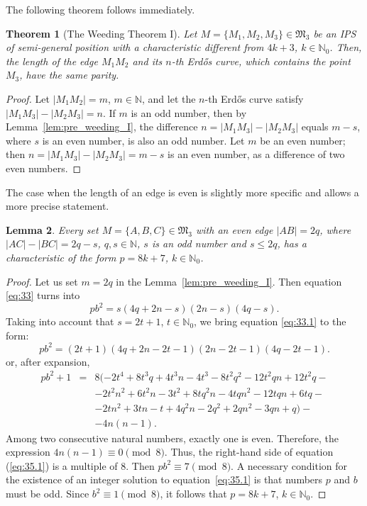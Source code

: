 \documentclass[a4paper,14pt]{article} %
\theoremstyle{plain}
\newtheorem{theorem}{Theorem}[section]
\newtheorem{lemma}[theorem]{Lemma}
\theoremstyle{definition}
\begin{document}
The following theorem follows immediately.

\begin{theorem}[The Weeding Theorem I]
	\label{thm:weeding_I}
	Let $M = \{M_1, M_2, M_3\} \in \mathfrak{M}_3$ be an IPS of semi-general position with a characteristic different from $4k+3$, $k \in \mathbb{N}_0$. Then, the length of the edge $M_1 M_2$ and its $n$-th Erdős curve, which contains the point $M_3$, have the same parity.
\end{theorem}

\begin{proof}
	Let $|M_1 M_2| = m$, $m \in \mathbb{N}$, and let the $n$-th Erdős curve satisfy $|M_1 M_3| - |M_2 M_3| = n$.
	If $m$ is an odd number, then by Lemma~\ref{lem:pre_weeding_I}, the difference $n = |M_1 M_3| - |M_2 M_3|$ equals $m - s$, where $s$ is an even number, is also an odd number.
	Let $m$ be an even number; then $n = |M_1 M_3| - |M_2 M_3| = m - s$ is an even number, as a difference of two even numbers.
\end{proof}

The case when the length of an edge is even is slightly more specific and allows a more precise statement.

\begin{lemma}
	\label{lem:pre_weeding_II}
	Every set $M = \{A, B, C\} \in \mathfrak{M}_3$ with an even edge $|AB| = 2q$, where $|AC| - |BC| = 2q - s$, $q, s \in \mathbb{N}$, $s$ is an odd number and $s \leq 2q$, has a characteristic of the form $p = 8k + 7$, $k \in \mathbb{N}_0$.
\end{lemma}

\begin{proof}
	Let us set $m = 2q$ in the Lemma~\ref{lem:pre_weeding_I}.
	Then equation \eqref{eq:33} turns into
	\begin{equation}
		\label{eq:33.1}
		pb^2 = s(4q + 2n - s)(2n - s)(4q - s).
	\end{equation}
	Taking into account that $s = 2t + 1$, $t \in \mathbb{N}_0$,
	we bring equation \eqref{eq:33.1} to the form:
	\begin{equation}
	pb^2 = (2t + 1)(4q + 2n - 2t - 1)(2n - 2t - 1)(4q - 2t - 1).
	\label{eq: 34.2}
	\end{equation}
	or, after expansion,
	\begin{eqnarray}
		pb^2 + 1&=& 8(-2t^4+8t^3q+4t^3n-4t^3-8t^2q^2-12t^2qn+12t^2q- {}\nonumber\\
			 &     &-2t^2n^2+6t^2n-3t^2+8tq^2n-4tqn^2-12tqn+6tq- {}\nonumber\\
			 &     &-2tn^2+3tn-t+4q^2n-2q^2+2qn^2-3qn+q)-  {}\nonumber\\
			   &     &-4n(n-1).
		\label{eq:35.1}
	\end{eqnarray}
	Among two consecutive natural numbers,
	exactly one is even.
	Therefore, the expression $4n(n-1)\equiv0\pmod{8}$.
	Thus, the right-hand side of equation (\ref{eq:35.1}) is a multiple of 8.
	Then $pb^2\equiv7\pmod{8}$.
	A necessary condition for the existence of an integer solution to equation~\eqref{eq:35.1}
	is that numbers $p$ and $b$ must be odd.
	Since $b^2\equiv1\pmod{8}$, it follows that $p=8k+7$, $k\in\mathbb{N}_0$.
\end{proof}
\end{document}
